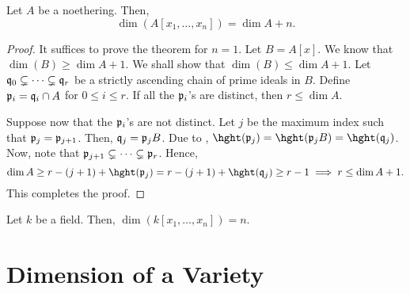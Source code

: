 \begin{theorem}
    Let $A$ be a noethering. Then, 
    \begin{equation*}
        \dim(A[x_1,\dots,x_n]) = \dim A + n.
    \end{equation*}
\end{theorem}
\begin{proof}
    It suffices to prove the theorem for $n = 1$. Let $B = A[x]$. We know that $\dim(B)\ge\dim A + 1$. We shall show that $\dim(B)\le\dim A + 1$. Let $\mathfrak q_0\subsetneq\dots\subsetneq\mathfrak q_r$ be a strictly ascending chain of prime ideals in $B$. Define $\mathfrak p_i = \mathfrak q_i\cap A$ for $0\le i\le r$. If all the $\mathfrak p_i$'s are distinct, then $r\le\dim A$.

    Suppose now that the $\mathfrak p_i$'s are not distinct. Let $j$ be the maximum index such that $\mathfrak p_j = \mathfrak p_{j + 1}$. Then, $\mathfrak q_j = \mathfrak p_j B$. Due to , $\hght(\frakp_j) = \hght(\frakp_j B) = \hght(\frakq_j)$. Now, note that $\mathfrak p_{j + 1}\subsetneq\dots\subsetneq\mathfrak p_{r}$. Hence, 
    \begin{equation*}
        \dim A\ge r - (j + 1) + \hght(\frakp_j) = r - (j + 1) + \hght(\frakq_j)\ge r - 1 \implies r\le\dim A + 1.
    \end{equation*}
    This completes the proof.
\end{proof}

\begin{corollary}
    Let $k$ be a field. Then, $\dim(k[x_1,\dots,x_n]) = n$.
\end{corollary}

\section{Dimension of a Variety}